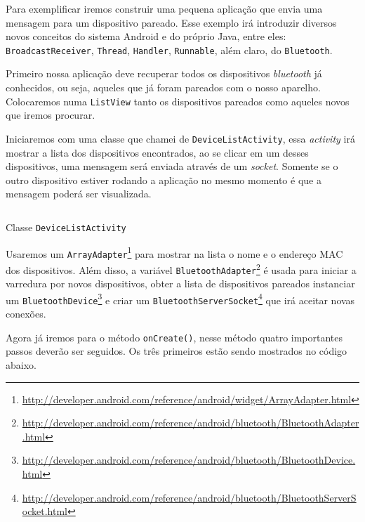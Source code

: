 \documentclass[a4paper,12pt,brazil,oneside]{book}
\begin{document}
	Para exemplificar iremos construir uma pequena aplicação que envia uma mensagem para um dispositivo pareado. Esse exemplo irá introduzir diversos novos conceitos do sistema Android e do próprio Java, entre eles: \texttt{BroadcastReceiver}, \texttt{Thread}, \texttt{Handler}, \texttt{Runnable}, além claro, do \texttt{Bluetooth}.
 
	 Primeiro nossa aplicação deve recuperar todos os dispositivos \emph{bluetooth} já conhecidos, ou seja, aqueles que já foram pareados com o nosso aparelho. Colocaremos numa \texttt{ListView} tanto os dispositivos pareados como aqueles novos que iremos procurar. 

	Iniciaremos com uma classe que chamei de \texttt{DeviceListActivity}, essa \emph{activity} irá mostrar a lista dos dispositivos encontrados, ao se clicar em um desses dispositivos, uma mensagem será enviada através de um \emph{socket}. Somente se o outro dispositivo estiver rodando a aplicação no mesmo momento é que a mensagem poderá ser visualizada.

	\begin{listing}[H]
	\inputminted[linenos=true,fontsize=\small,frame=lines, framesep=2mm, tabsize=2,numbersep=5pt]{java}{src/api/bluetooth/activity.java}
	\caption{Classe \texttt{DeviceListActivity}}
	\label{code:bluetooth-activity}
	\end{listing} 			

	Usaremos um \texttt{ArrayAdapter}\footnote{\href{http://developer.android.com/reference/android/widget/ArrayAdapter.html}{http://developer.android.com/reference/android/widget/ArrayAdapter.html}} para mostrar na lista o nome e o endereço MAC dos dispositivos. Além disso, a variável \texttt{BluetoothAdapter}\footnote{\href{http://developer.android.com/reference/android/bluetooth/BluetoothAdapter.html}{http://developer.android.com/reference/android/bluetooth/BluetoothAdapter.html}} é usada para iniciar a varredura por novos dispositivos, obter a lista de dispositivos pareados instanciar um \texttt{BluetoothDevice}\footnote{\href{http://developer.android.com/reference/android/bluetooth/BluetoothDevice.html}{http://developer.android.com/reference/android/bluetooth/BluetoothDevice.html}} e criar um \texttt{BluetoothServerSocket}\footnote{\href{http://developer.android.com/reference/android/bluetooth/BluetoothServerSocket.html}{http://developer.android.com/reference/android/bluetooth/BluetoothServerSocket.html}} que irá aceitar novas conexões. 

	Agora já iremos para o método \texttt{onCreate()}, nesse método quatro importantes passos deverão ser seguidos. Os três primeiros estão sendo mostrados no código abaixo.
\end{document}
